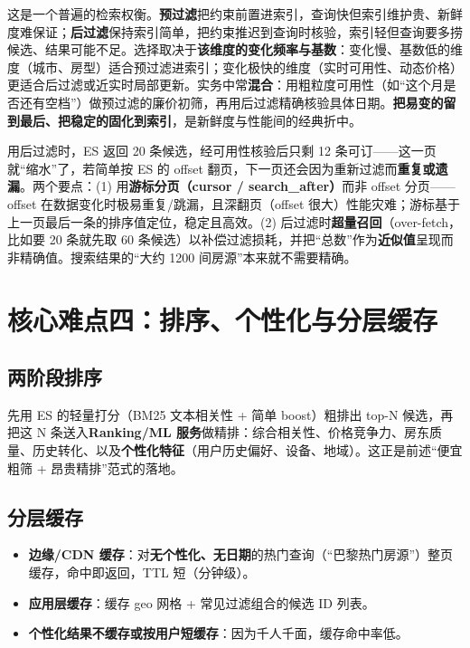 \begin{idea}
这是一个普遍的检索权衡。\textbf{预过滤}把约束前置进索引，查询快但索引维护贵、新鲜度难保证；\textbf{后过滤}保持索引简单，把约束推迟到查询时核验，索引轻但查询要多捞候选、结果可能不足。选择取决于\textbf{该维度的变化频率与基数}：变化慢、基数低的维度（城市、房型）适合预过滤进索引；变化极快的维度（实时可用性、动态价格）更适合后过滤或近实时局部更新。实务中常\textbf{混合}：用粗粒度可用性（如“这个月是否还有空档”）做预过滤的廉价初筛，再用后过滤精确核验具体日期。\textbf{把易变的留到最后、把稳定的固化到索引}，是新鲜度与性能间的经典折中。
\end{idea}

\begin{pitfall}
用后过滤时，ES 返回 20 条候选，经可用性核验后只剩 12 条可订——这一页就“缩水”了，若简单按 ES 的 offset 翻页，下一页还会因为重新过滤而\textbf{重复或遗漏}。两个要点：(1) 用\textbf{游标分页（cursor / search\_after）}而非 offset 分页——offset 在数据变化时极易重复/跳漏，且深翻页（offset 很大）性能灾难；游标基于上一页最后一条的排序值定位，稳定且高效。(2) 后过滤时\textbf{超量召回}（over-fetch，比如要 20 条就先取 60 条候选）以补偿过滤损耗，并把“总数”作为\textbf{近似值}呈现而非精确值。搜索结果的“大约 1200 间房源”本来就不需要精确。
\end{pitfall}

\section{核心难点四：排序、个性化与分层缓存}

\subsection{两阶段排序}

先用 ES 的轻量打分（BM25 文本相关性 + 简单 boost）粗排出 top-N 候选，再把这 N 条送入\textbf{Ranking/ML 服务}做精排：综合相关性、价格竞争力、房东质量、历史转化、以及\textbf{个性化特征}（用户历史偏好、设备、地域）。这正是前述“便宜粗筛 + 昂贵精排”范式的落地。

\subsection{分层缓存}

\begin{itemize}
  \item \textbf{边缘/CDN 缓存}：对\textbf{无个性化、无日期}的热门查询（“巴黎热门房源”）整页缓存，命中即返回，TTL 短（分钟级）。
  \item \textbf{应用层缓存}：缓存 geo 网格 + 常见过滤组合的候选 ID 列表。
  \item \textbf{个性化结果不缓存或按用户短缓存}：因为千人千面，缓存命中率低。
\end{itemize}


